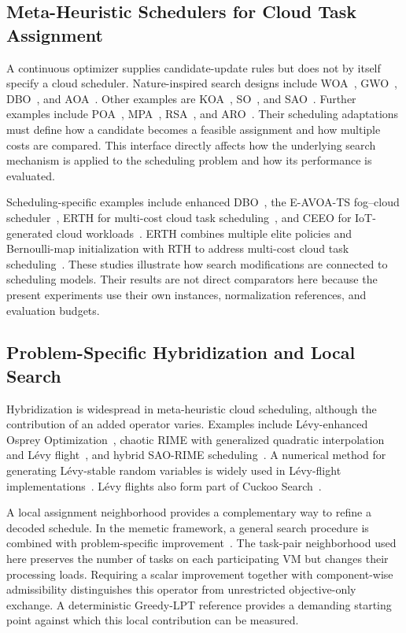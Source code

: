 \documentclass[pdflatex,onecolumn,sn-mathphys-num]{sn-jnl}
\begin{document}
\subsection{Meta-Heuristic Schedulers for Cloud Task Assignment}

A continuous optimizer supplies candidate-update rules but does not by itself specify a cloud scheduler. Nature-inspired search designs include WOA~\cite{Mirjalili2016}, GWO~\cite{Mirjalili2014}, DBO~\cite{Xue2022}, and AOA~\cite{Abualigah2021}. Other examples are KOA~\cite{AbdelBasset2023}, SO~\cite{Hashim2022}, and SAO~\cite{Deng2023}. Further examples include POA~\cite{Trojovsky2022}, MPA~\cite{Faramarzi2020}, RSA~\cite{Abualigah2022}, and ARO~\cite{Wang2022}. Their scheduling adaptations must define how a candidate becomes a feasible assignment and how multiple costs are compared. This interface directly affects how the underlying search mechanism is applied to the scheduling problem and how its performance is evaluated.

Scheduling-specific examples include enhanced DBO~\cite{Xie2024}, the E-AVOA-TS fog--cloud scheduler~\cite{Ghafari2023}, ERTH for multi-cost cloud task scheduling~\cite{Qin2024}, and CEEO for IoT-generated cloud workloads~\cite{EbrahimiMood2025}. ERTH combines multiple elite policies and Bernoulli-map initialization with RTH to address multi-cost cloud task scheduling~\cite{Qin2024}. These studies illustrate how search modifications are connected to scheduling models. Their results are not direct comparators here because the present experiments use their own instances, normalization references, and evaluation budgets.

\subsection{Problem-Specific Hybridization and Local Search}

Hybridization is widespread in meta-heuristic cloud scheduling, although the contribution of an added operator varies. Examples include L\'{e}vy-enhanced Osprey Optimization~\cite{Chintale2024}, chaotic RIME with generalized quadratic interpolation and L\'{e}vy flight~\cite{Sabipour2025}, and hybrid SAO-RIME scheduling~\cite{Zhu2025}. A numerical method for generating L\'{e}vy-stable random variables is widely used in L\'{e}vy-flight implementations~\cite{Mantegna1994}. L\'{e}vy flights also form part of Cuckoo Search~\cite{YangDeb2009}.

A local assignment neighborhood provides a complementary way to refine a decoded schedule. In the memetic framework, a general search procedure is combined with problem-specific improvement~\cite{Moscato1989}. The task-pair neighborhood used here preserves the number of tasks on each participating VM but changes their processing loads. Requiring a scalar improvement together with component-wise admissibility distinguishes this operator from unrestricted objective-only exchange. A deterministic Greedy-LPT reference provides a demanding starting point against which this local contribution can be measured.
\end{document}
